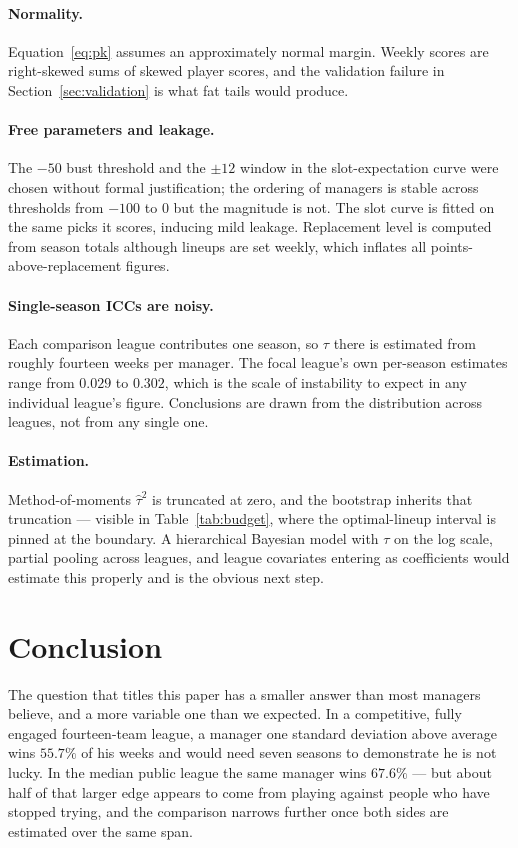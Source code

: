 \documentclass[11pt]{article}
\begin{document}
\paragraph{Normality.} Equation~\eqref{eq:pk} assumes an approximately normal
margin. Weekly scores are right-skewed sums of skewed player scores, and the
validation failure in Section~\ref{sec:validation} is what fat tails would
produce.

\paragraph{Free parameters and leakage.} The $-50$ bust threshold and the
$\pm12$ window in the slot-expectation curve were chosen without formal
justification; the ordering of managers is stable across thresholds from $-100$
to $0$ but the magnitude is not. The slot curve is fitted on the same picks it
scores, inducing mild leakage. Replacement level is computed from season totals
although lineups are set weekly, which inflates all points-above-replacement
figures.

\paragraph{Single-season ICCs are noisy.} Each comparison league contributes one
season, so $\tau$ there is estimated from roughly fourteen weeks per manager. The
focal league's own per-season estimates range from $0.029$ to $0.302$, which is
the scale of instability to expect in any individual league's figure. Conclusions
are drawn from the distribution across leagues, not from any single one.

\paragraph{Estimation.} Method-of-moments $\widehat\tau^2$ is truncated at zero,
and the bootstrap inherits that truncation --- visible in
Table~\ref{tab:budget}, where the optimal-lineup interval is pinned at the
boundary. A hierarchical Bayesian model with $\tau$ on the log scale, partial
pooling across leagues, and league covariates entering as coefficients would
estimate this properly and is the obvious next step.

\section{Conclusion}

The question that titles this paper has a smaller answer than most managers
believe, and a more variable one than we expected. In a competitive, fully
engaged fourteen-team league, a manager one standard deviation above average wins
$55.7\%$ of his weeks and would need seven seasons to demonstrate he is not
lucky. In the median public league the same manager wins $67.6\%$ --- but about
half of that larger edge appears to come from playing against people who have
stopped trying, and the comparison narrows further once both sides are estimated
over the same span.
\end{document}
